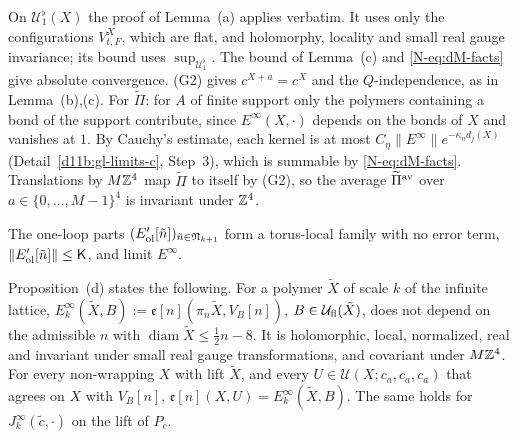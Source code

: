 \begin{step}[Proof]
On $\mathcal U^\flat_1(X)$ the proof of Lemma~(a) applies verbatim. It uses only the configurations $V^X_{t,F}$, which are flat, and holomorphy, locality and small real gauge invariance; its bound uses $\sup_{\mathcal U^\flat_1}$. The bound of Lemma~(c) and \eqref{N-eq:dM-facts} give absolute convergence. (G2) gives $c^{X+a}=c^X$ and the $Q$-independence, as in Lemma~(b),(c). For $\widetilde\Pi$: for $A$ of finite support only the polymers containing a bond of the support contribute, since $E^\infty(X,\cdot)$ depends on the bonds of $X$ and vanishes at $1$. By Cauchy's estimate, each kernel is at most $C_\eta\|E^\infty\|e^{-\kappa_nd_j(X)}$ (Detail~\ref{d11b:gl-limits-c}, Step~3), which is summable by \eqref{N-eq:dM-facts}. Translations by $M\mathbb Z^4$ map $\widetilde\Pi$ to itself by (G2), so the average $\widetilde\Pi^{\rm av}$ over $a\in\{0,\dots,M-1\}^4$ is invariant under $\mathbb Z^4$.
\end{step}

\begin{detail}\label{d11b:OL}
The one-loop parts $(E'_{\rm ol}[\tilde n])_{\tilde n\in\mathfrak N_{k+1}}$ form a torus-local family with no error term, $\|E'_{\rm ol}[\tilde n]\|\le\mathsf K$, and limit $E^\infty$.
\end{detail}

\begin{step}
Proposition~(d) states the following. For a polymer $\tilde X$ of scale $k$ of the infinite lattice, $E^\infty_k(\tilde X,B):=\mathfrak e[n](\pi_n\tilde X,V_B[n])$, $B\in\mathcal U_{\rm fl}(\tilde X)$, does not depend on the admissible $n$ with $\operatorname{diam}\tilde X\le\frac12n-8$. It is holomorphic, local, normalized, real and invariant under small real gauge transformations, and covariant under $M\mathbb Z^4$. For every non-wrapping $X$ with lift $\tilde X$, and every $U\in\mathcal U(X;c_a,c_a,c_a)$ that agrees on $X$ with $V_B[n]$, $\mathfrak e[n](X,U)=E^\infty_k(\tilde X,B)$. The same holds for $J^\infty_k(\tilde c,\cdot)$ on the lift of $P_c$.
\end{step}

